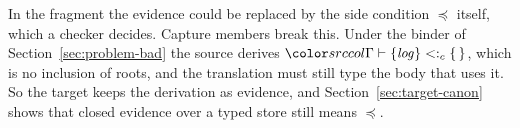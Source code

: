 In the fragment the evidence could be replaced by the side condition $\preccurlyeq$ itself, which a checker decides. Capture members break this. Under the binder of Section~\ref{sec:problem-bad} the source derives $\subcj{\Gamma}{\cset{\mathit{log}}}{\cempty}$, which is no inclusion of roots, and the translation must still type the body that uses it. So the target keeps the derivation as evidence, and Section~\ref{sec:target-canon} shows that closed evidence over a typed store still means $\preccurlyeq$.
